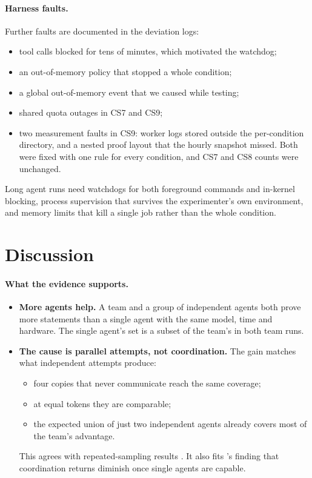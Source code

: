 \documentclass[11pt]{article}
\begin{document}
\paragraph{Harness faults.}
Further faults are documented in the deviation logs:
\begin{itemize}
  \item tool calls blocked for tens of minutes, which motivated the watchdog;
  \item an out-of-memory policy that stopped a whole condition;
  \item a global out-of-memory event that we caused while testing;
  \item shared quota outages in CS7 and CS9;
  \item two measurement faults in CS9: worker logs stored outside the per-condition directory, and a nested proof
    layout that the hourly snapshot missed. Both were fixed with one rule for every condition, and CS7 and CS8 counts
    were unchanged.
\end{itemize}
Long agent runs need watchdogs for both foreground commands and in-kernel blocking, process supervision that survives
the experimenter's own environment, and memory limits that kill a single job rather than the whole condition.

\section{Discussion}
\label{sec:discussion}
\paragraph{What the evidence supports.}
\begin{itemize}
  \item \textbf{More agents help.} A team and a group of independent agents both prove more statements than a single
    agent with the same model, time and hardware. The single agent's set is a subset of the team's in both team runs.
  \item \textbf{The cause is parallel attempts, not coordination.} The gain matches what independent attempts produce:
    \begin{itemize}
      \item four copies that never communicate reach the same coverage;
      \item at equal tokens they are comparable;
      \item the expected union of just two independent agents already covers most of the team's advantage.
    \end{itemize}
    This agrees with repeated-sampling results \citep{brown2024monkeys,li2024moreagents}. It also fits
    \citet{kim2025scaling}'s finding that coordination returns diminish once single agents are capable.
\end{itemize}
\end{document}
